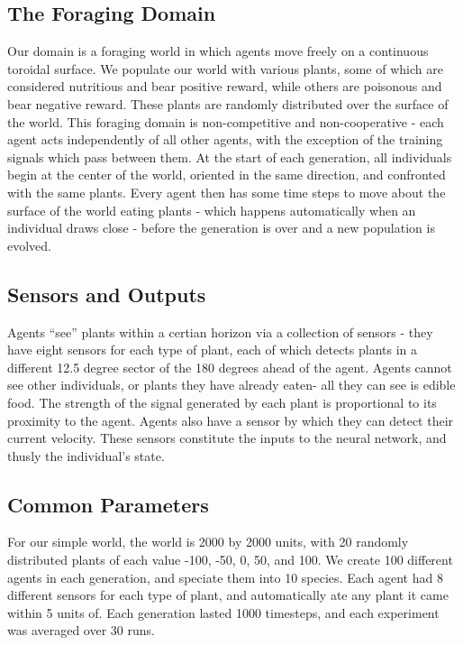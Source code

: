 \documentclass{acm_proc_article-sp}
\begin{document}
\subsection*{The Foraging Domain}
    Our domain is a foraging world in which agents move freely on a continuous toroidal surface. We populate our world with various plants, some of which are considered nutritious and bear positive reward, while others are poisonous and bear negative reward. These plants are randomly distributed over the surface of the world. This foraging domain is non-competitive and non-cooperative - each agent acts independently of all other agents, with the exception of the training signals which pass between them. At the start of each generation, all individuals begin at the center of the world, oriented in the same direction, and confronted with the same plants. Every agent then has some time steps to move about the surface of the world eating plants - which happens automatically when an individual draws close - before the generation is over and a new population is evolved.
    
\subsection*{Sensors and Outputs}

  Agents ``see'' plants within a certian horizon via a collection of sensors - they have eight sensors for each type of plant, each of which detects plants in a different 12.5 degree sector of the 180 degrees ahead of the agent. Agents cannot see other individuals, or plants they have already eaten- all they can see is edible food. The strength of the signal generated by each plant is proportional to its proximity to the agent. Agents also have a sensor by which they can detect their current velocity. These sensors constitute the inputs to the neural network, and thusly the individual's state.


\subsection*{Common Parameters}

For our simple world, the world is 2000 by 2000 units, with 20 randomly distributed plants of each value -100, -50, 0, 50, and 100. We create 100 different agents in each generation, and speciate them into 10 species. Each agent had 8 different sensors for each type of plant, and automatically ate any plant it came within 5 units of. Each generation lasted 1000 timesteps, and each experiment was averaged over 30 runs.
\end{document}
